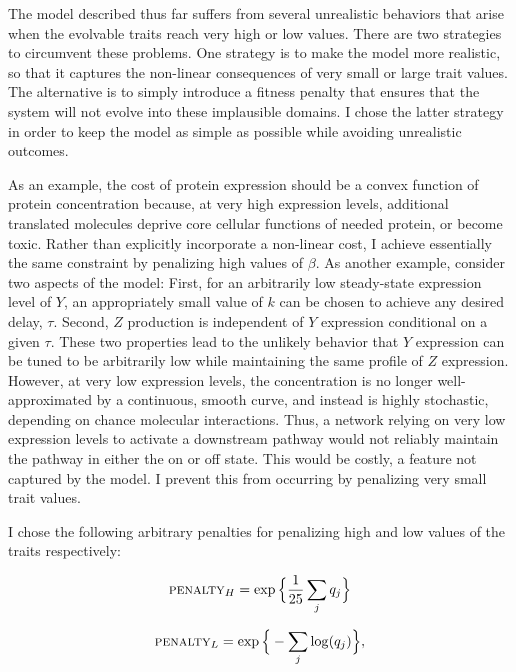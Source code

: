 \documentclass[dvips,12pt,twoside,titlepage]{article}
\begin{document}
The model described thus far suffers from several unrealistic behaviors that arise when the evolvable traits reach very high or low values. There are two strategies to circumvent these problems. One strategy is to make the model more realistic, so that it captures the non-linear consequences of very small or large trait values. The alternative is to simply introduce a fitness penalty that ensures that the system will not evolve into these implausible domains. I chose the latter strategy in order to keep the model as simple as possible while avoiding unrealistic outcomes. 

As an example, the cost of protein expression should be a convex function of protein concentration \cite{Dekel:2005p1914} because, at very high expression levels, additional translated molecules deprive core cellular functions of needed protein, or become toxic. 
Rather than explicitly incorporate a non-linear cost, I achieve essentially the same constraint by penalizing high values of $\beta$. 
As another example, consider two aspects of the model: 
First, for an arbitrarily low steady-state expression level of $Y$, an appropriately small value of $k$ can be chosen to achieve any desired delay, $\tau$. 
Second, $Z$ production is independent of $Y$ expression conditional on a given $\tau$. 
These two properties lead to the unlikely behavior that $Y$ expression can be tuned to be arbitrarily low while maintaining the same profile of $Z$ expression. 
However, at very low expression levels, the concentration is no longer well-approximated by a continuous, smooth curve, and instead is highly stochastic, depending on chance molecular interactions. 
Thus, a network relying on very low expression levels to activate a downstream pathway would not reliably maintain the pathway in either the on or off state. 
This would be costly, a feature not captured by the model. 
I prevent this from occurring by penalizing very small trait values.

I chose the following arbitrary penalties for penalizing high and low values of the traits respectively:

\begin{displaymath}
\textsc{penalty}_H = \exp\Big\{\frac{1}{25}\sum_{j}q_j\Big\}
\end{displaymath}

\vspace{0.6cm}

\begin{displaymath}
\textsc{penalty}_L = \exp\Big\{-\sum_j \log(q_j)\Big\},
\end{displaymath}
\end{document}
